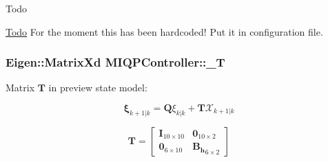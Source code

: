 \begin{DoxyRefDesc}{\-Todo}
\item[\hyperlink{todo__todo000008}{\-Todo}]\-For the moment this has been hardcoded! \-Put it in configuration file. \end{DoxyRefDesc}
\hypertarget{classMIQPController_a1143455ae85d0e221578dbe5d659af1d}{
\subsubsection[{\-\_\-\-T}]{\setlength{\rightskip}{0pt plus 5cm}\-Eigen\-::\-Matrix\-Xd {\bf \-M\-I\-Q\-P\-Controller\-::\-\_\-\-T}}}\label{classMIQPController_a1143455ae85d0e221578dbe5d659af1d}
\-Matrix $\mathbf{T}$ in preview state model\-:

\[ \mathbf{\xi}_{k+1|k} = \mathbf{Q} \xi_{k|k} + \mathbf{T}\mathcal{X}_{k+1|k} \]

\[ \mathbf{T} = \left[\begin{array}{cc} \mathbf{I}_{10\times10} & \mathbf{0}_{10\times2}\\ \mathbf{0}_{6\times10} & \mathbf{B_h}_{6\times2} \end{array}\right] \]

